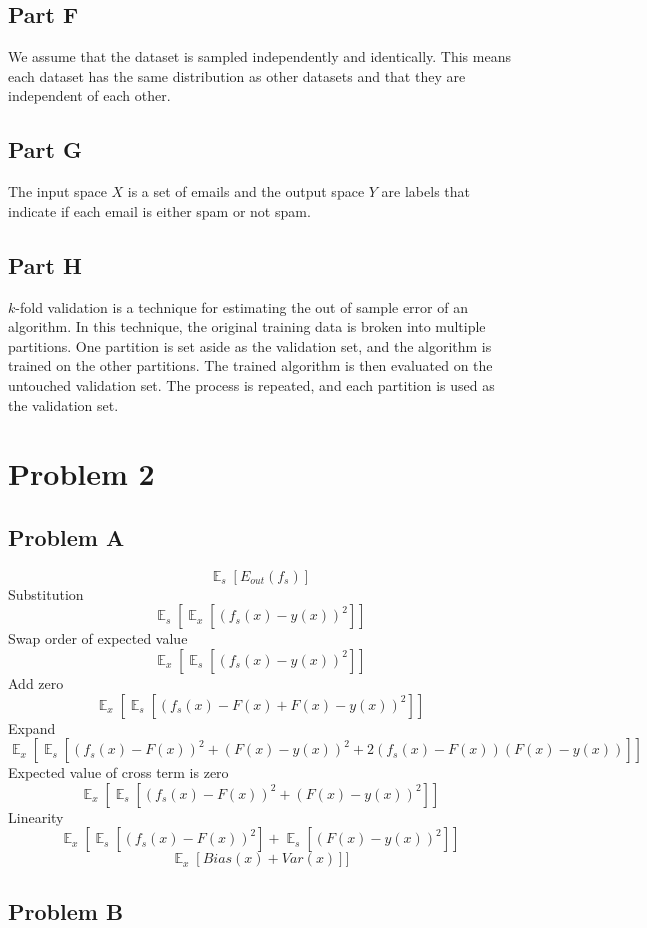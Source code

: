 \documentclass[12pt]{article} %
\DeclareMathOperator{\E}{\mathbb{E}}
\begin{document}
\subsection{Part F}
We assume that the dataset is sampled independently and identically. This means each dataset has the same distribution as other datasets and that they are independent of each other.

\subsection{Part G}
The input space $X$ is a set of emails and the output space $Y$ are labels that indicate if each email is either spam or not spam.

\subsection{Part H}
$k$-fold validation is a technique for estimating the out of sample error of an algorithm. In this technique, the original training data is broken into multiple partitions. One partition is set aside as the validation set, and the algorithm is trained on the other partitions. The trained algorithm is then evaluated on the untouched validation set. The process is repeated, and each partition is used as the validation set.

\section{Problem 2}

\subsection{Problem A}
$$ \E_s[E_{out}(f_s)] $$
Substitution
$$ \E_s[\E_x[(f_s(x) - y(x))^2]] $$
Swap order of expected value
$$ \E_x[\E_s[(f_s(x) - y(x))^2]] $$
Add zero
$$ \E_x[\E_s[(f_s(x) - F(x) + F(x) - y(x))^2]] $$
Expand
$$ \E_x[\E_s[(f_s(x) - F(x))^2 + (F(x) - y(x))^2 + 2(f_s(x) - F(x))(F(x) - y(x))]] $$
Expected value of cross term is zero
$$ \E_x[\E_s[(f_s(x) - F(x))^2 + (F(x) - y(x))^2 ]] $$
Linearity
$$ \E_x[\E_s[(f_s(x) - F(x))^2] + \E_s[(F(x) - y(x))^2 ]] $$
$$ \E_x[Bias(x)+ Var(x) ]] $$


\subsection{Problem B}
\end{document}
